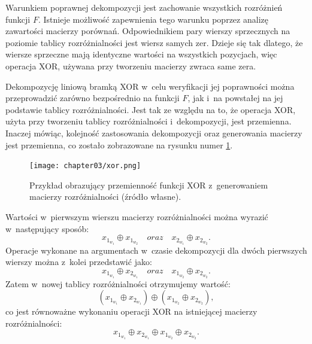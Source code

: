 Warunkiem poprawnej dekompozycji jest zachowanie wszystkich rozróżnień funkcji $F$.
Istnieje możliwość zapewnienia tego warunku poprzez analizę zawartości macierzy porównań.
Odpowiednikiem pary wierszy sprzecznych na poziomie tablicy rozróżnialności jest wiersz samych zer.
Dzieje się tak dlatego,
że wiersze sprzeczne mają identyczne wartości na wszystkich pozycjach,
więc operacja XOR,
używana przy tworzeniu macierzy zwraca same zera.

Dekompozycję liniową bramką XOR w~celu weryfikacji jej poprawności można przeprowadzić zarówno bezpośrednio na funkcji $F$,
jak i~na powstałej na jej podstawie tablicy rozróżnialności.
Jest tak ze względu na to,
że operacja XOR,
użyta przy tworzeniu tablicy rozróżnialności i~dekompozycji,
jest przemienna.
Inaczej mówiąc,
kolejność zastosowania dekompozycji oraz generowania macierzy jest przemienna,
co zostało zobrazowane na rysunku numer \ref{fig:xor}.

\begin{figure}[H]
\centering
\texttt{[image: chapter03/xor.png]}
\caption{Przykład obrazujący przemienność funkcji XOR z~generowaniem macierzy rozróżnialności (źródło własne).}
\label{fig:xor}
\end{figure}

Wartości w~pierwszym wierszu macierzy rozróżnialności można wyrazić w~następujący sposób:
\begin{equation}
x_{1_{w_1}} \oplus x_{1_{w_2}} \quad oraz \quad x_{2_{w_1}} \oplus x_{2_{w_2}}.
\end{equation}
Operacje wykonane na argumentach w~czasie dekompozycji dla dwóch pierwszych wierszy można z~kolei przedstawić jako:
\begin{equation}
x_{1_{w_1}} \oplus x_{2_{w_1}} \quad oraz \quad x_{1_{w_2}} \oplus x_{2_{w_2}}.
\end{equation}
Zatem w~nowej tablicy rozróżnialności otrzymujemy wartość:
\begin{equation}
(x_{1_{w_1}} \oplus x_{2_{w_1}}) \oplus (x_{1_{w_2}} \oplus x_{2_{w_2}}),
\end{equation}
 co jest równoważne wykonaniu operacji XOR na istniejącej macierzy rozróżnialności:
\begin{equation}
x_{1_{w_1}} \oplus x_{2_{w_1}} \oplus x_{1_{w_2}} \oplus x_{2_{w_2}}.
\end{equation}

